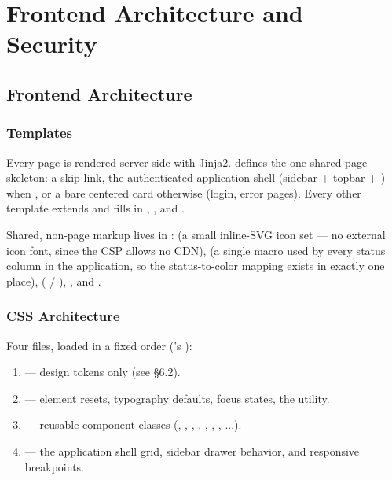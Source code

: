 \chapter{Frontend Architecture and Security}

\section{Frontend Architecture}

\subsection*{Templates}

Every page is rendered server-side with Jinja2. 
defines the one shared page skeleton: a skip link, the authenticated
application shell (sidebar + topbar + ) when
, or a bare centered card
otherwise (login, error pages). Every other template extends
 and fills in ,
, and .

Shared, non-page markup lives in :
 (a small inline-SVG icon set --- no external icon
font, since the CSP allows no CDN),  (a single
 macro used by
every status column in the application, so the status-to-color mapping
exists in exactly one place),  ( /
), , and .

\subsection*{CSS Architecture}

Four files, loaded in a fixed order ('s ):

\begin{enumerate}[nosep]
  \item {} --- design tokens only (see \S6.2).
  \item {} --- element resets, typography defaults, focus
        states, the  utility.
  \item {} --- reusable component classes
        (, , , ,
        , , , ...).
  \item {} --- the application shell grid, sidebar drawer
        behavior, and responsive breakpoints.
\end{enumerate}

